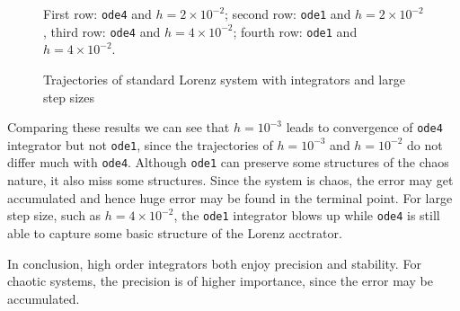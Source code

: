 \documentclass[english, nochinese]{pnote}
\begin{document}
\begin{figure}[htbp]
{
\centering
\scalebox{0.5}{}
\scalebox{0.5}{}
\scalebox{0.5}{}
\scalebox{0.5}{}
\caption{Trajectories of standard Lorenz system with integrators and large step sizes}
\label{Fig:Int2}
}
{
\footnotesize First row: \texttt{ode4} and $ h = 2 \times 10^{-2} $; second row: \texttt{ode1} and $ h = 2 \times 10^{-2} $, third row: \texttt{ode4} and $ h = 4 \times 10^{-2} $; fourth row: \texttt{ode1} and $ h = 4 \times 10^{-2} $.
}
\end{figure}

Comparing these results we can see that $ h = 10^{-3} $ leads to convergence of \verb"ode4" integrator but not \verb"ode1", since the trajectories of $ h = 10^{-3} $ and $ h = 10^{-2} $ do not differ much with \verb"ode4". Although \verb"ode1" can preserve some structures of the chaos nature, it also miss some structures. Since the system is chaos, the error may get accumulated and hence huge error may be found in the terminal point. For large step size, such as $ h = 4 \times 10^{-2} $, the \verb"ode1" integrator blows up while \verb"ode4" is still able to capture some basic structure of the Lorenz acctrator.

In conclusion, high order integrators both enjoy precision and stability. For chaotic systems, the precision is of higher importance, since the error may be accumulated.
\end{document}
